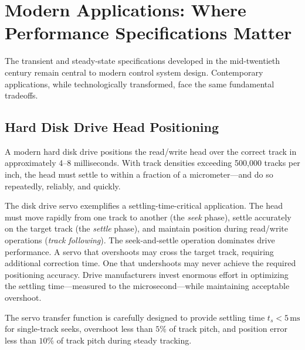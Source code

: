 \section{Modern Applications: Where Performance Specifications Matter}

The transient and steady-state specifications developed in the mid-twentieth century remain central to modern control system design. Contemporary applications, while technologically transformed, face the same fundamental tradeoffs.

\subsection{Hard Disk Drive Head Positioning}

\begin{applicationbox}
A modern hard disk drive positions the read/write head over the correct track in approximately 4--8 milliseconds. With track densities exceeding 500,000 tracks per inch, the head must settle to within a fraction of a micrometer---and do so repeatedly, reliably, and quickly.
\end{applicationbox}

The disk drive servo exemplifies a settling-time-critical application. The head must move rapidly from one track to another (the \textit{seek} phase), settle accurately on the target track (the \textit{settle} phase), and maintain position during read/write operations (\textit{track following}). The seek-and-settle operation dominates drive performance. A servo that overshoots may cross the target track, requiring additional correction time. One that undershoots may never achieve the required positioning accuracy. Drive manufacturers invest enormous effort in optimizing the settling time---measured to the microsecond---while maintaining acceptable overshoot.

The servo transfer function is carefully designed to provide settling time $t_s < 5\,\text{ms}$ for single-track seeks, overshoot less than $5\%$ of track pitch, and position error less than $10\%$ of track pitch during steady tracking.

